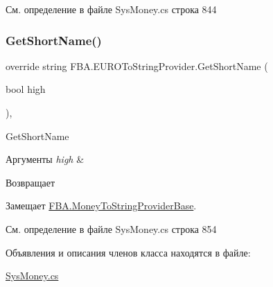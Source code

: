 См. определение в файле Sys\+Money.\+cs строка 844

\mbox{\label{class_f_b_a_1_1_e_u_r_o_to_string_provider_a7823c1debfb91be0eb7d995140d7af33}} 
\subsubsection{\texorpdfstring{Get\+Short\+Name()}{GetShortName()}}
{\footnotesize\ttfamily override string F\+B\+A.\+E\+U\+R\+O\+To\+String\+Provider.\+Get\+Short\+Name (\begin{DoxyParamCaption}\item[{bool}]{high }\end{DoxyParamCaption})\hspace{0.3cm}{\ttfamily [protected]}, {\ttfamily [virtual]}}



Get\+Short\+Name 


\begin{DoxyParams}{Аргументы}
{\em high} & \\
\hline
\end{DoxyParams}
\begin{DoxyReturn}{Возвращает}

\end{DoxyReturn}


Замещает \mbox{\hyperlink{class_f_b_a_1_1_money_to_string_provider_base_a88f493205be3da3950e2175f1e033595}{F\+B\+A.\+Money\+To\+String\+Provider\+Base}}.



См. определение в файле Sys\+Money.\+cs строка 854



Объявления и описания членов класса находятся в файле\+:\begin{DoxyCompactItemize}
\item 
\mbox{\hyperlink{_sys_money_8cs}{Sys\+Money.\+cs}}\end{DoxyCompactItemize}
